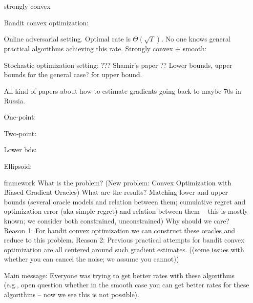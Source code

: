 strongly convex


Bandit convex optimization:

Online adversarial setting. Optimal rate is $\Theta(\sqrt{T})$.
No one knows general practical algorithms achieving this rate.
Strongly convex + smooth: \cite{hazan2014bandit}

Stochastic optimization setting: ??? Shamir's paper \cite{shamir2012complexity}??
Lower bounds, upper bounds for the general case?
\cite{hazan2014bandit} for upper bound.

All kind of papers about how to estimate gradients going back to maybe 70s in Russia.

One-point: \cite{flaxman2005online}

Two-point: \cite{AgDeXi10}

Lower bds: \cite{raginsky2011information} \cite{Chen88:LB-AoS}

Ellipsoid: \cite{AgFoHsuKaRa13:SIAM}



 framework
What is the problem? (New problem: Convex Optimization with Biased Gradient Oracles)
What are the results? Matching lower and upper bounds (several oracle models and relation between them; cumulative regret and optimization error (aka simple regret) and relation between them -- this is mostly known; we consider both constrained, unconstrained)
Why should we care?
Reason 1: For bandit convex optimization we can construct these oracles and reduce to this problem.
Reason 2: Previous practical attempts for bandit convex optimization are all centered around such gradient estimates.
((some issues with whether you can cancel the noise; we assume you cannot))

Main message: Everyone was trying to get better rates with these algorithms (e.g., open question whether in the smooth case you can get better rates for these algorithms -- now we see this is not possible).
\fi
